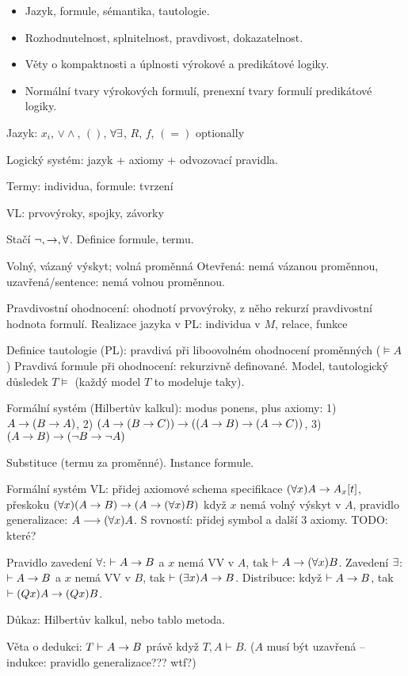 \begin{itemize}
\item Jazyk, formule, sémantika, tautologie.
\item Rozhodnutelnost, splnitelnost, pravdivost, dokazatelnost.
\item Věty o kompaktnosti a úplnosti výrokové a predikátové logiky.
\item Normální tvary výrokových formulí, prenexní tvary formulí predikátové logiky.
\end{itemize}

Jazyk: $x_i$, $\vee\wedge$, $()$, $\forall\exists$, $R$, $f$, $(=)$ optionally

Logický systém: jazyk + axiomy + odvozovací pravidla.

Termy: individua, formule: tvrzení

VL: prvovýroky, spojky, závorky

Stačí $\neg,\rightarrow,\forall$.
Definice formule, termu.

Volný, vázaný výskyt; volná proměnná
Otevřená: nemá vázanou proměnnou, uzavřená/sentence: nemá volnou proměnnou.

Pravdivostní ohodnocení: ohodnotí prvovýroky, z něho rekurzí pravdivostní
hodnota formulí.
Realizace jazyka v PL: individua v $M$, relace, funkce

Definice tautologie (PL): pravdivá při liboovolném ohodnocení proměnných
($\vDash A$)
Pravdivá formule při ohodnocení: rekurzivně definované.
Model, tautologický důsledek $T\vDash$ (každý model $T$ to modeluje taky).

Formální systém (Hilbertův kalkul): modus ponens, plus axiomy:
1) $A\rightarrow(B\rightarrow A)$, 2) $(A\rightarrow(B\rightarrow C))\rightarrow((A\rightarrow B)\rightarrow(A\rightarrow C))$,
3) $(A\rightarrow B)\rightarrow(\neg B\rightarrow\neg A)$

Substituce (termu za proměnné). Instance formule.

Formální systém VL: přidej axiomové schema specifikace $(\forall x)A\rightarrow A_x[t]$,
přeskoku $(\forall x)(A\rightarrow B)\rightarrow(A\rightarrow (\forall x)B)$ když $x$ nemá volný výskyt v $A$,
pravidlo generalizace: $A \longrightarrow (\forall x) A$.
S rovností: přidej symbol a další 3 axiomy. TODO: které?

Pravidlo zavedení $\forall$: $\vdash A\rightarrow B$ a $x$ nemá VV v $A$, tak $\vdash A\rightarrow
(\forall x)B$.
Zavedení $\exists$: $\vdash A\rightarrow B$ a $x$ nemá VV v $B$, tak $\vdash (\exists x)A\rightarrow B$.
Distribuce: když $\vdash A\rightarrow B$, tak $\vdash (Qx)A\rightarrow (Qx)B$.

Důkaz: Hilbertův kalkul, nebo tablo metoda.

Věta o dedukci: $T\vdash A\rightarrow B$ právě když $T,A\vdash B$.
($A$ musí být uzavřená -- indukce: pravidlo generalizace??? wtf?)

